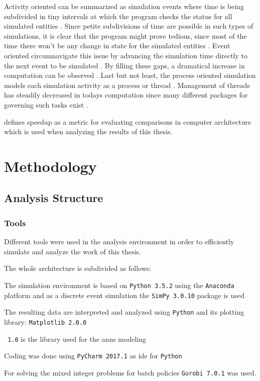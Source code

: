 \documentclass[draft=false]{seal_thesis}
\begin{document}
Activity oriented can be summarized as simulation events where time is being subdivided in tiny intervals at which the program checks the status for all simulated entities \citep{Matloff2008}. Since petite subdivisions of time are possible in such types of simulations, it is clear that the program might prove tedious, since most of the time there won't be any change in state for the simulated entities \citep{Matloff2008}. Event oriented circumnavigate this issue by advancing the simulation time directly to the next event to be simulated \citep{Matloff2008}. By filling these gaps, a dramatical increase in computation can be observed \citep{Matloff2008}. Last but not least, the process oriented simulation models each simulation activity as a process or thread \citep{Matloff2008}. Management of threads has steadily decreased in todays computation since many different packages for governing such tasks exist \citep{Matloff2008}.

\citet{Milo2012} defines speedup as a metric for evaluating comparisons in computer architecture which is used when analyzing the results of this thesis.

\glsresetall

\chapter{Methodology}
\label{ch:methodology}

\section{Analysis Structure}
\subsection{Tools}
Different tools were used in the analysis environment in order to efficiently simulate and analyze the work of this thesis.

The whole architecture is subdivided as follows:
\begin{enumerate*}
	\item The simulation environment is based on \texttt{Python 3.5.2} using the \texttt{Anaconda} platform and as a discrete event simulation the \texttt{SimPy 3.0.10} package is used
	\item The resulting data are interpreted and analyzed using \texttt{Python} and its plotting library: \texttt{Matplotlib 2.0.0}
	\item \texttt{ 1.0} is the library used for the \glspl{ann} modeling
	\item Coding was done using \texttt{PyCharm 2017.1} as \gls{ide} for \texttt{Python}
	\item For solving the mixed integer problems for batch policies \texttt{Gurobi 7.0.1} was used.
\end{enumerate*}
\end{document}

